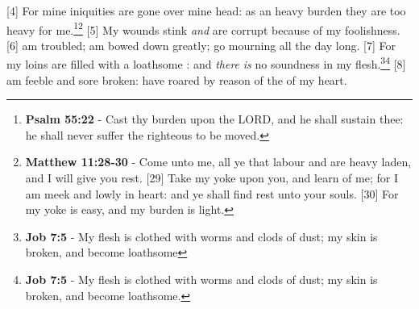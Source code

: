 [4] \textcolor[cmyk]{0.99998,1,0,0}{For mine iniquities are gone over mine head: as an heavy burden they are too heavy for me.}\footnote{\textbf{Psalm 55:22} - Cast thy burden upon the LORD, and he shall sustain thee: he shall never suffer the righteous to be moved.}\footnote{\textbf{Matthew 11:28-30} - Come unto me, all ye that labour and are heavy laden, and I will give you rest. [29] Take my yoke upon you, and learn of me; for I am meek and lowly in heart: and ye shall find rest unto your souls. [30] For my yoke is easy, and my burden is light.} %
[5] \textcolor[cmyk]{0.99998,1,0,0}{My wounds stink \emph{and} are corrupt because of my foolishness.}
[6] \textcolor[cmyk]{0.99998,1,0,0}{ am troubled;  am bowed down greatly;  go mourning all the day long.}
[7] \textcolor[cmyk]{0.99998,1,0,0}{For my loins are filled with a loathsome : and \emph{there} \emph{is} no soundness in my flesh.}\footnote{\textbf{Job 7:5} - My flesh is clothed with worms and clods of dust; my skin is broken, and become loathsome}\footnote{\textbf{Job 7:5} - My flesh is clothed with worms and clods of dust; my skin is broken, and become loathsome.} %
[8] \textcolor[cmyk]{0.99998,1,0,0}{ am feeble and sore broken:  have roared by reason of the  of my heart.}
